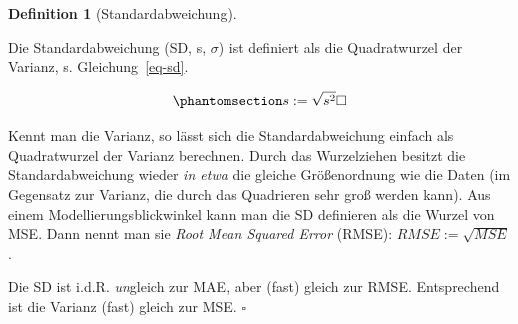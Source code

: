 \documentclass[
  letterpaper,
  oneside,
  open=any]{scrbook}
\theoremstyle{definition}
\theoremstyle{definition}
\theoremstyle{definition}
\newtheorem{definition}{Definition}[chapter]
\theoremstyle{remark}
\begin{document}
\begin{definition}[Standardabweichung]\protect\hypertarget{def-sd}{}\label{def-sd}

Die Standardabweichung (SD, s, \(\sigma\)) ist definiert als die
Quadratwurzel der Varianz, s. Gleichung~\ref{eq-sd}.

\begin{equation}\phantomsection\label{eq-sd}{s := \sqrt{s^2} \square}\end{equation}

\end{definition}

Kennt man die Varianz, so lässt sich die Standardabweichung einfach als
Quadratwurzel der Varianz berechnen. Durch das Wurzelziehen besitzt die
Standardabweichung wieder \emph{in etwa} die gleiche Größenordnung wie
die Daten (im Gegensatz zur Varianz, die durch das Quadrieren sehr groß
werden kann). Aus einem Modellierungsblickwinkel kann man die SD
definieren als die Wurzel von MSE. Dann nennt man sie \emph{Root Mean
Squared Error} (RMSE): \(RMSE := \sqrt{MSE}\).

\begin{tcolorbox}[enhanced jigsaw, bottomrule=.15mm, left=2mm, colbacktitle=quarto-callout-note-color!10!white, bottomtitle=1mm, colframe=quarto-callout-note-color-frame, coltitle=black, rightrule=.15mm, breakable, toptitle=1mm, titlerule=0mm, title=\textcolor{quarto-callout-note-color}{\faInfo}\hspace{0.5em}{Hinweis}, opacitybacktitle=0.6, arc=.35mm, colback=white, leftrule=.75mm, opacityback=0, toprule=.15mm]

Die SD ist i.d.R. \emph{un}gleich zur MAE, aber (fast) gleich zur RMSE.
Entsprechend ist die Varianz (fast) gleich zur MSE. \(\square\)

\end{tcolorbox}
\end{document}
